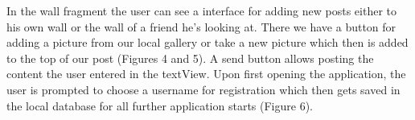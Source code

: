 \documentclass{report}
\begin{document}
In the wall fragment the user can see a interface for adding new posts either to his own wall or the wall of a friend he's looking at. There we have a button for adding a picture from our local gallery or take a new picture which then is added to the top of our post (Figures 4 and 5). A send button allows posting the content the user entered in the textView. Upon first opening the application, the user is prompted to choose a username for registration which then gets saved in the local database for all further application starts (Figure 6).
\begin{figure}[H]
	\centering
	\hfill
	\hfill
	
\end{figure}
\end{document}
